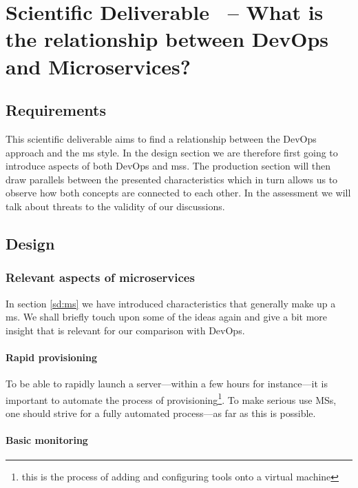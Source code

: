 \section{Scientific Deliverable \thesdel\ -- What is the relationship between DevOps and Microservices?}
\label{sd:devops}


\subsection{Requirements}

This scientific deliverable aims to find a relationship between the
DevOps approach and the \gls{ms} style. In the design section we are
therefore first going to introduce aspects of both DevOps and
\glspl{ms}. The production section will then draw parallels between
the presented characteristics which in turn allows us to observe how
both concepts are connected to each other. In the assessment we will
talk about threats to the validity of our discussions.

\subsection{Design}

\subsubsection{Relevant aspects of microservices}

In section \ref{sd:ms} we have introduced characteristics that
generally make up a \gls{ms}. We shall briefly touch upon some of the
ideas again and give a bit more insight that is relevant for our
comparison with DevOps.

\paragraph{Rapid provisioning}

To be able to rapidly launch a server---within a few hours for
instance---it is important to automate the process of
provisioning\footnote{this is the process of adding and configuring
tools onto a virtual machine}. To make serious use MSs, one should
strive for a fully automated process---as far as this is possible.
\cite{ms-prereq}

\paragraph{Basic monitoring}

